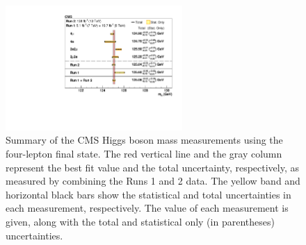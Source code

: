 \begin{figure}[!htb]
  \centering
  \includegraphics[width=0.60\textwidth]{Figure_009.pdf}
  \caption{Summary of the CMS Higgs boson mass measurements using the four-lepton final state. The red vertical line and the gray column represent the best fit value and the total uncertainty, respectively, as measured by combining the Runs 1 and 2 data. The yellow band and horizontal black bars show the statistical and total uncertainties in each measurement, respectively. The value of each measurement is given, along with the total and statistical only (in parentheses) uncertainties.}
  \label{Run1Run2_scan}
\end{figure}
